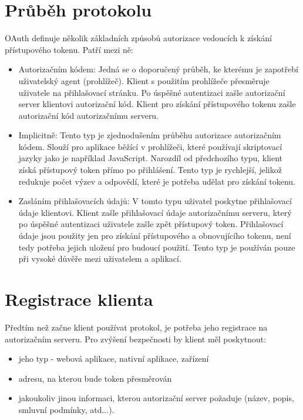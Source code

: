 \documentclass[]{fithesis3}
\begin{document}
	\section{Průběh protokolu}

	OAuth definuje několik základních způsobů autorizace vedoucích k získání přístupového 			tokenu. Patří mezi ně:

		\begin{itemize}
 		\item Autorizačním kódem:
  		\newline
		Jedná se o doporučený průběh, ke kterému je zapotřebí uživatelský agent 						(prohlížeč). Klient s použitím prohlížeče přesměruje uživatele na přihlašovací stránku. Po 			úspěšné autentizaci zašle autorizační server klientovi autorizační kód. Klient pro získání 			přístupového tokenu zašle autorizační kód autorizačnímu serveru.
  		\item Implicitně:
  		\newline
		Tento typ je zjednodušením průběhu autorizace autorizačním kódem. Slouží pro aplikace 			běžící v prohlížeči, které používají skriptovací jazyky jako je například JavaScript. Narozdíl 		od předchozího typu, klient získá přístupový token přímo po přihlášení. Tento typ je 				rychlejší,	jelikož redukuje počet výzev a odpovědí, které je potřeba udělat pro získání 				tokenu.
 	 	\item Zasláním přihlašovacích údajů:
  		\newline
		V tomto typu uživatel poskytne přihlašovací údaje klientovi. Klient zašle přihlašovací údaje 		autorizačnímu serveru, který po úspěšné autentizaci uživatele zašle zpět přístupový 				token. Přihlašovací údaje jsou použity jen pro získání přístupového a obnovujícího tokenu, 			není tedy potřeba jejich uložení pro budoucí použití. Tento typ je používán pouze při 				vysoké důvěře mezi uživatelem a aplikací. 
		\end{itemize}
		
	\newpage

	\section{Registrace klienta}

	Předtím než začne klient používat protokol, je potřeba jeho registrace na autorizačním serveru. 	Pro zvýšení bezpečnosti by klient měl poskytnout:

	\begin{itemize}
  		\item jeho typ - webová aplikace, nativní aplikace, zařízení
		\item adresu, na kterou bude token přesměrován
		\item jakoukoliv jinou informaci, kterou autorizační server požaduje (název, popis, smluvní 				podmínky, atd...).
	\end{itemize}
\end{document}
